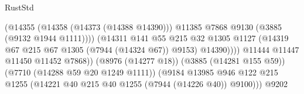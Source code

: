\begin{lexlean}{RustStd}
\begin{coremodule}
                                                        (@14355
                                                          (@14358 (@14373 (@14388 @14390)))
                                                          @11385
                                                          @7868
                                                          @9130
                                                          (@3885 (@9132 @1944 @1111))))
                                                      (@14311
                                                        @141
                                                        @55
                                                        @215
                                                        @32
                                                        @1305
                                                        @1127
                                                        (@14319
                                                          @67
                                                          @215
                                                          @67
                                                          @1305
                                                          (@7944 (@14324 @67))
                                                          @9153)
                                                        @14390))))
                                                @11444
                                                @11447
                                                @11450
                                                @11452
                                                @7868))
                                            (@8976 (@14277 @18))
                                            (@3885 (@14281 @155 @59))
                                            (@7710 (@14288 @59 @20 @1249 @1111))
                                            (@9184
                                              @13985
                                              @946
                                              @122
                                              @215
                                              @1255
                                              (@14221
                                                @40
                                                @215
                                                @40
                                                @1255
                                                (@7944 (@14226 @40))
                                                @9100)))
                                          @9202

\end{coremodule}
\end{lexlean}
